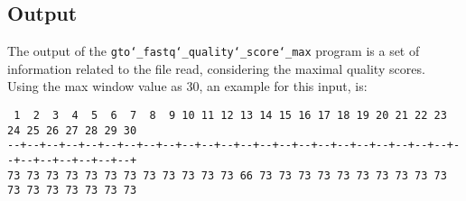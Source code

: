 \subsection*{Output}
The output of the \texttt{gto\char`_fastq\char`_quality\char`_score\char`_max} program is a set of information related to the file read, considering the maximal quality scores.  \\
Using the max window value as 30, an example for this input, is: 
\begin{lstlisting}
 1  2  3  4  5  6  7  8  9 10 11 12 13 14 15 16 17 18 19 20 21 22 23 24 25 26 27 28 29 30 
--+--+--+--+--+--+--+--+--+--+--+--+--+--+--+--+--+--+--+--+--+--+--+--+--+--+--+--+--+--+
73 73 73 73 73 73 73 73 73 73 73 73 66 73 73 73 73 73 73 73 73 73 73 73 73 73 73 73 73 73 
\end{lstlisting}